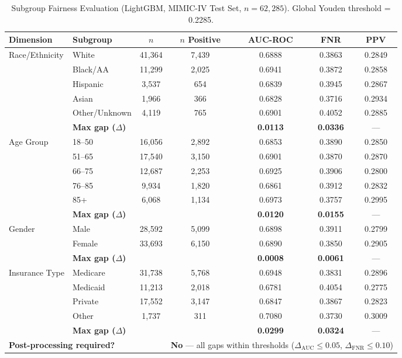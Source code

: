 \documentclass[11pt,letterpaper]{article}
\begin{document}
\begin{table}[H]
\centering
\caption{Subgroup Fairness Evaluation (LightGBM, MIMIC-IV Test Set, $n = 62{,}285$). Global Youden threshold = 0.2285.}
\label{tab:fairness}
\begin{tabular}{llccccc}
\toprule
\textbf{Dimension} & \textbf{Subgroup} & \textbf{$n$} & \textbf{$n$ Positive} & \textbf{AUC-ROC} & \textbf{FNR} & \textbf{PPV} \\
\midrule
\multirow{5}{*}{Race/Ethnicity}
  & White           & 41,364 & 7,439 & 0.6888 & 0.3863 & 0.2849 \\
  & Black/AA        & 11,299 & 2,025 & 0.6941 & 0.3872 & 0.2858 \\
  & Hispanic        &  3,537 &   654 & 0.6839 & 0.3945 & 0.2867 \\
  & Asian           &  1,966 &   366 & 0.6828 & 0.3716 & 0.2934 \\
  & Other/Unknown   &  4,119 &   765 & 0.6901 & 0.4052 & 0.2885 \\
  & \multicolumn{2}{l}{\textbf{Max gap ($\Delta$)}} & & \textbf{0.0113} & \textbf{0.0336} & --- \\
\midrule
\multirow{6}{*}{Age Group}
  & 18--50          & 16,056 & 2,892 & 0.6853 & 0.3890 & 0.2850 \\
  & 51--65          & 17,540 & 3,150 & 0.6901 & 0.3870 & 0.2870 \\
  & 66--75          & 12,687 & 2,253 & 0.6925 & 0.3906 & 0.2800 \\
  & 76--85          &  9,934 & 1,820 & 0.6861 & 0.3912 & 0.2832 \\
  & 85+             &  6,068 & 1,134 & 0.6973 & 0.3757 & 0.2995 \\
  & \multicolumn{2}{l}{\textbf{Max gap ($\Delta$)}} & & \textbf{0.0120} & \textbf{0.0155} & --- \\
\midrule
\multirow{3}{*}{Gender}
  & Male            & 28,592 & 5,099 & 0.6898 & 0.3911 & 0.2799 \\
  & Female          & 33,693 & 6,150 & 0.6890 & 0.3850 & 0.2905 \\
  & \multicolumn{2}{l}{\textbf{Max gap ($\Delta$)}} & & \textbf{0.0008} & \textbf{0.0061} & --- \\
\midrule
\multirow{5}{*}{Insurance Type}
  & Medicare        & 31,738 & 5,768 & 0.6948 & 0.3831 & 0.2896 \\
  & Medicaid        & 11,213 & 2,018 & 0.6781 & 0.4054 & 0.2775 \\
  & Private         & 17,552 & 3,147 & 0.6847 & 0.3867 & 0.2823 \\
  & Other           &  1,737 &   311 & 0.7080 & 0.3730 & 0.3009 \\
  & \multicolumn{2}{l}{\textbf{Max gap ($\Delta$)}} & & \textbf{0.0299} & \textbf{0.0324} & --- \\
\midrule
\multicolumn{3}{l}{\textbf{Post-processing required?}} & \multicolumn{4}{l}{\textbf{No} --- all gaps within thresholds ($\Delta_\text{AUC} \leq 0.05$, $\Delta_\text{FNR} \leq 0.10$)} \\
\bottomrule
\end{tabular}
\end{table}
\end{document}
